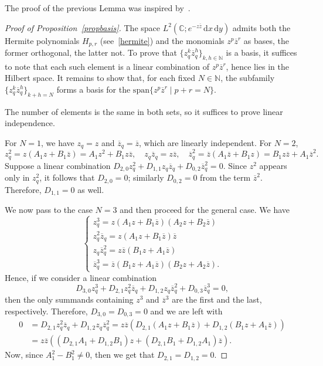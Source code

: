 \documentclass[10pt]{amsart}
\theoremstyle{plain}
\theoremstyle{definition}
\renewcommand{\bar}[1]{\overline{#1}}
\begin{document}
The proof of the previous Lemma was inspired by~\cite{mathexc}.



\begin{proof}[Proof of Proposition~\ref{propbasis}]
The space $ L^2(\mathbb{C}; e^{-z\bar z} \, \mathrm{d}x\,\mathrm{d}y) $ admits both the Hermite polynomials $ H_{p,r} $ (see~\ref{hermite}) and the monomials $ z^p \bar{z}^r $ as bases, the former orthogonal, the latter not. 
To prove that $ \{z_q^k \bar{z}_q^h\}_{k,h \in \mathbb{N}} $ is a basis, it suffices to note that each such element is a linear combination of $ z^p \bar{z}^r $, hence lies in the Hilbert space. 
It remains to show that, for each fixed $ N \in \mathbb{N} $, the subfamily $ \{z_q^k \bar{z}_q^h\}_{k + h = N} $ forms a basis for the $ \mathrm{span}\{z^p \bar{z}^r \mid p + r = N\} $.

The number of elements is the same in both sets, so it suffices to prove linear independence. 

For $ N = 1 $, we have $ z_q = z $ and $ \bar{z}_q = \bar{z} $, which are linearly independent. For $ N = 2 $,
\[
z_q^2 = z(A_1 z + B_1 \bar{z}) = A_1 z^2 + B_1 z \bar{z}, \quad
z_q \bar{z}_q = z \bar{z}, \quad
\bar{z}_q^2 = \bar{z}(A_1 \bar{z} + B_1 z) = B_1 z \bar{z} + A_1 \bar{z}^2.
\]
Suppose a linear combination $ D_{2,0} z_q^2 + D_{1,1} z_q \bar{z}_q + D_{0,2} \bar{z}_q^2 = 0 $. Since $ z^2 $ appears only in $ z_q^2 $, it follows that $ D_{2,0} = 0 $; similarly $ D_{0,2} = 0 $ from the term $ \bar{z}^2 $. Therefore, $ D_{1,1} = 0 $ as well.

We now pass to the case $N=3$ and then proceed for the general case.
We have
\[
\begin{cases}
z_q^3=z(A_1 z + B_1 \bar{z}) (A_2 z + B_2 \bar{z}) \\
z_q^2\bar z_{q}=z(A_1 z + B_1 \bar{z}) \bar z\\
z_q\bar z_q^2=z\bar z(B_1 z + A_1 \bar{z}) \\
\bar z_q^3=\bar z(B_1 z + A_1 \bar{z}) (B_2 z + A_2 \bar{z}).
\end{cases}
\]
Hence, if we consider a linear combination
\[D_{3,0}z_q^3+D_{2,1}z_q^2\bar z_{q}+D_{1,2}z_q\bar z_q^2+D_{0,3}\bar z_q^3=0,\]
then the only summands containing $z^{3}$ and $\bar z^{3}$ are the first and the last, respectively.
Therefore, $D_{3,0}=D_{0,3}=0$ and we are left with
\begin{align*}
0&=D_{2,1}z_q^2\bar z_{q}+D_{1,2}z_q\bar z_q^2=z\bar z(D_{2,1}(A_1 z + B_1 \bar{z})+D_{1,2}(B_1 z + A_1 \bar{z}))\\
&=z\bar z((D_{2,1}A_{1}+D_{1,2}B_{1})z+(D_{2,1}B_{1}+D_{1,2}A_{1})\bar z).
\end{align*}
Now, since $A_{1}^{2}-B_{1}^{2}\neq 0$, then we get that $D_{2,1}=D_{1,2}=0$.




\end{proof}
\end{document}
